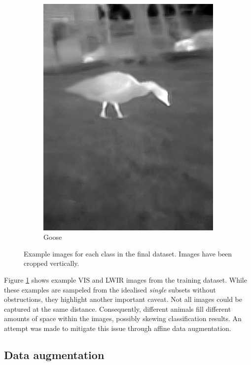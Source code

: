 \documentclass{l4proj}
\begin{document}
\begin{figure}[ht]
\begin{subfigure}[h!]{0.18\textwidth}
    \includegraphics[width=\textwidth, trim={0cm 2.5cm 0cm 2.5cm}, clip]{images/dataset/goose/lwir.png}
    \caption{Goose}
  \end{subfigure}
  \caption{Example images for each class in the final dataset. Images have been cropped vertically.}
  \label{fig:dataset_classes}
\end{figure}

Figure \ref{fig:dataset_classes} shows example VIS and LWIR images from the training dataset. While these examples are sampeled from the idealised \textit{single} subsets without obstructions, they highlight another important caveat. Not all images could be captured at the same distance. Consequently, different animals fill different amounts of space within the images, possibly skewing classification results. An attempt was made to mitigate this issue through affine data augmentation.

\subsection{Data augmentation}
\end{document}
